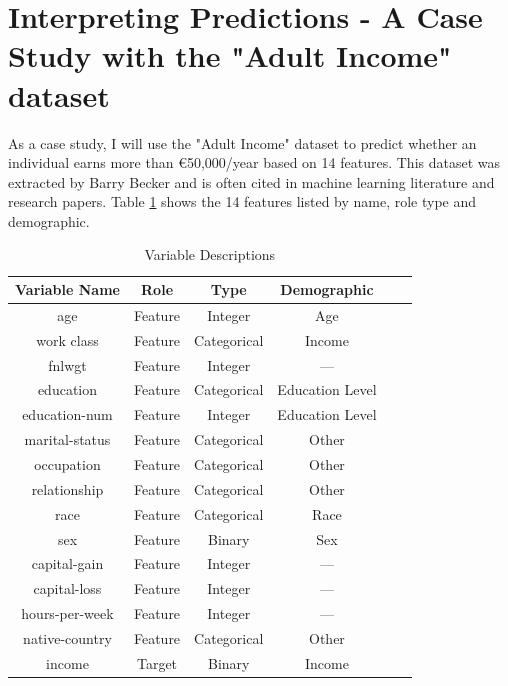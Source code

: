 \documentclass[10pt,journal,compsoc]{IEEEtran}
\begin{document}
\section{Interpreting Predictions - A Case Study with the "Adult Income" dataset}
As a case study, I will use the "Adult Income" dataset\cite{misc_adult_2} to predict whether an individual earns more than €50,000/year based on 14 features. This dataset was extracted by Barry Becker \cite{misc_adult_2} and is often cited in machine learning literature and research papers.
Table \ref{tab:variable-descriptions} shows the 14 features listed by name, role type and demographic.

\begin{table}[h]
    \centering
    \caption{Variable Descriptions}
    \begin{tabularx}{\columnwidth}{cccccc}
        \toprule
        \textbf{Variable Name} & \textbf{Role} & \textbf{Type} & \textbf{Demographic} \\
        \midrule
        age                    & Feature       & Integer       & Age                  \\
        work class              & Feature       & Categorical   & Income               \\
        fnlwgt                 & Feature       & Integer       & ---                  \\
        education              & Feature       & Categorical   & Education Level      \\
        education-num          & Feature       & Integer       & Education Level      \\
        marital-status         & Feature       & Categorical   & Other                \\
        occupation             & Feature       & Categorical   & Other                \\
        relationship           & Feature       & Categorical   & Other                \\
        race                   & Feature       & Categorical   & Race                 \\
        sex                    & Feature       & Binary        & Sex                  \\
        capital-gain           & Feature       & Integer       & ---                  \\
        capital-loss           & Feature       & Integer       & ---                  \\
        hours-per-week         & Feature       & Integer       & ---                  \\
        native-country         & Feature       & Categorical   & Other                \\
        income                 & Target        & Binary        & Income               \\
        \bottomrule
    \end{tabularx}
    \label{tab:variable-descriptions}
\end{table}
\end{document}
